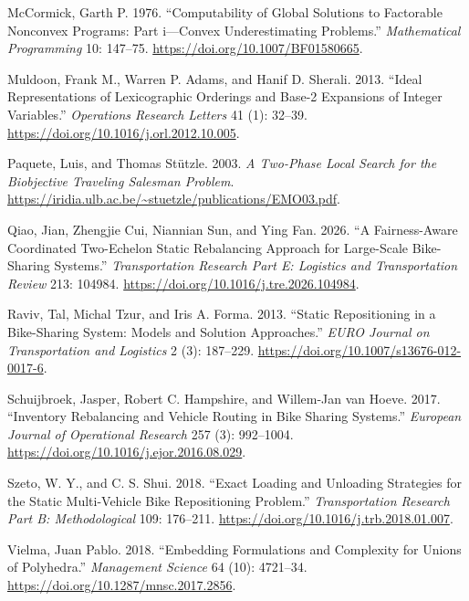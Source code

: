 \documentclass[
  american,
  11pt,
]{article}
\newlength{\cslhangindent}
\newenvironment{CSLReferences}[2] %
 {\begin{list}{}{%
  \setlength{\itemindent}{0pt}
  \setlength{\leftmargin}{0pt}
  \setlength{\parsep}{0pt}
  \ifodd #1
   \setlength{\leftmargin}{\cslhangindent}
   \setlength{\itemindent}{-1\cslhangindent}
  \fi
  \setlength{\itemsep}{#2\baselineskip}}}
 {\end{list}}
\begin{document}
\begin{CSLReferences}{1}{1}
McCormick, Garth P. 1976. {``Computability of Global Solutions to
Factorable Nonconvex Programs: Part i---Convex Underestimating
Problems.''} \emph{Mathematical Programming} 10: 147--75.
\url{https://doi.org/10.1007/BF01580665}.

Muldoon, Frank M., Warren P. Adams, and Hanif D. Sherali. 2013. {``Ideal
Representations of Lexicographic Orderings and Base-2 Expansions of
Integer Variables.''} \emph{Operations Research Letters} 41 (1): 32--39.
\url{https://doi.org/10.1016/j.orl.2012.10.005}.

Paquete, Luis, and Thomas Stützle. 2003. \emph{A Two-Phase Local Search
for the Biobjective Traveling Salesman Problem}.
\url{https://iridia.ulb.ac.be/~stuetzle/publications/EMO03.pdf}.

Qiao, Jian, Zhengjie Cui, Niannian Sun, and Ying Fan. 2026. {``A
Fairness-Aware Coordinated Two-Echelon Static Rebalancing Approach for
Large-Scale Bike-Sharing Systems.''} \emph{Transportation Research Part
E: Logistics and Transportation Review} 213: 104984.
\url{https://doi.org/10.1016/j.tre.2026.104984}.

Raviv, Tal, Michal Tzur, and Iris A. Forma. 2013. {``Static
Repositioning in a Bike-Sharing System: Models and Solution
Approaches.''} \emph{EURO Journal on Transportation and Logistics} 2
(3): 187--229. \url{https://doi.org/10.1007/s13676-012-0017-6}.

Schuijbroek, Jasper, Robert C. Hampshire, and Willem-Jan van Hoeve.
2017. {``Inventory Rebalancing and Vehicle Routing in Bike Sharing
Systems.''} \emph{European Journal of Operational Research} 257 (3):
992--1004. \url{https://doi.org/10.1016/j.ejor.2016.08.029}.

Szeto, W. Y., and C. S. Shui. 2018. {``Exact Loading and Unloading
Strategies for the Static Multi-Vehicle Bike Repositioning Problem.''}
\emph{Transportation Research Part B: Methodological} 109: 176--211.
\url{https://doi.org/10.1016/j.trb.2018.01.007}.

Vielma, Juan Pablo. 2018. {``Embedding Formulations and Complexity for
Unions of Polyhedra.''} \emph{Management Science} 64 (10): 4721--34.
\url{https://doi.org/10.1287/mnsc.2017.2856}.

\end{CSLReferences}
\end{document}
